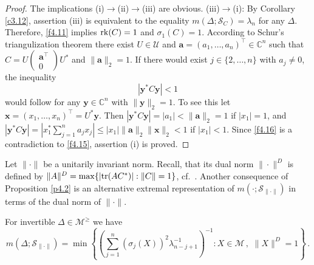 \documentclass{amsart}
\begin{document}
\begin{proof}
The implications (i)$\to$(ii)$\to$(iii) are obvious. \newline
(iii)$\to$(i): By Corollary \ref{c3.12}, assertion (iii) is equivalent to the equality $m(\Delta ; {\mathcal S}_C) = \lambda_n$ for any $\Delta$. Therefore, \eqref{f4.11} implies ${\rm rk}(C)=1$ and $\sigma_1(C)=1$. According to Schur's triangulization theorem there exist $U \in {\mathcal U}$ and ${\mathbf a}=(a_1,\ldots,a_n)^\top \in {\mathbb C}^n$ such that $C=U \left( \begin{array}{c} {\mathbf a}^\top \\ 0 \end{array} \right) U^*$ and $\| {\mathbf a}\|_2=1$. If there would exist $j \in \{ 2,\ldots,n \}$ with $a_j \not= 0$, the inequality 
\begin{equation} \label{f4.16}
     \left| {\mathbf y}^* C {\mathbf y} \right| < 1
\end{equation}
would follow for any ${\mathbf y} \in {\mathbb C}^n$ with $\| {\mathbf y} \|_2=1$.  To see this let ${\mathbf x}=(x_1,\ldots,x_n)^\top = U^* {\mathbf y}$. Then 
$ \left| {\mathbf y}^* C {\mathbf y} \right| = | a_1 |< \| {\mathbf a} \|_2=1$ if $| x_1 | =1$, and $ \left| {\mathbf y}^* C {\mathbf y} \right| = | x_1^* \sum_{j=1}^n a_jx_j | \leq | x_1 | \| {\mathbf a} \|_2 \| {\mathbf x} \|_2 < 1$ if $| x_1 | < 1$. Since \eqref{f4.16} is a contradiction to \eqref{f4.15}, assertion (i) is proved. 
\end{proof}   

Let $\| \cdot \|$ be a unitarily invariant norm. Recall, that its dual norm $\| \cdot \|^D$ is defined by $\| A \|^D = \max \{ | {\rm tr}(AC^*)| : \| C \| = 1 \}$, cf.~\cite[5.4.12]{HJ2}. Another consequence of Proposition \ref{p4.2} is an alternative extremal representation of $m( \cdot ; {\mathcal S}_{\| \cdot \|})$ in terms of the dual norm of $\| \cdot \|$.

\begin{pro} \label{p4.8}
    For invertible $\Delta \in {\mathcal M}^\geq$ we have 
    \begin{equation*}
    m(\Delta ;  {\mathcal S}_{\| \cdot \|}) = \min \left\{ \left( \sum_{j=1}^n (\sigma_j(X))^2 \lambda_{n-j+1}^{-1} \right)^{-1} : X \in {\mathcal M} \, , \, \,\| X \|^D=1 \right\} \, .
    \end{equation*}
\end{pro}
\end{document}
